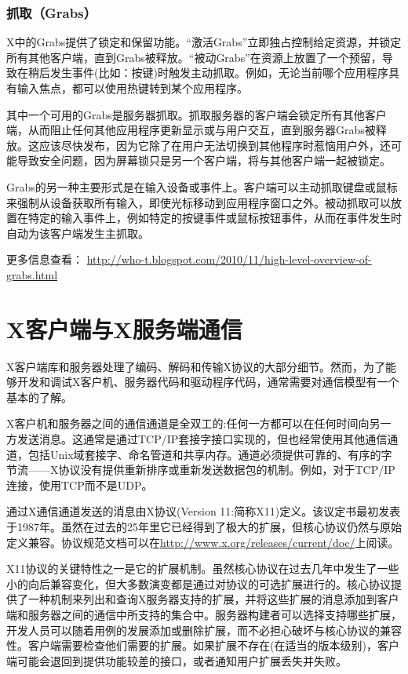 \subsubsection{抓取（Grabs）}

X中的Grabs提供了锁定和保留功能。“激活Grabs”立即独占控制给定资源，并锁定所有其他客户端，直到Grabs被释放。“被动Grabs”在资源上放置了一个预留，导致在稍后发生事件(比如：按键)时触发主动抓取。例如，无论当前哪个应用程序具有输入焦点，都可以使用热键转到某个应用程序。

其中一个可用的Grabs是服务器抓取。抓取服务器的客户端会锁定所有其他客户端，从而阻止任何其他应用程序更新显示或与用户交互，直到服务器Grabs被释放。这应该尽快发布，因为它除了在用户无法切换到其他程序时惹恼用户外，还可能导致安全问题，因为屏幕锁只是另一个客户端，将与其他客户端一起被锁定。

Grabs的另一种主要形式是在输入设备或事件上。客户端可以主动抓取键盘或鼠标来强制从设备获取所有输入，即使光标移动到应用程序窗口之外。被动抓取可以放置在特定的输入事件上，例如特定的按键事件或鼠标按钮事件，从而在事件发生时自动为该客户端发生主抓取。

更多信息查看：
\href{http://who-t.blogspot.com/2010/11/high-level-overview-of-grabs.html}{http://who-t.blogspot.com/2010/11/high-level-overview-of-grabs.html}

\section{X客户端与X服务端通信}

X客户端库和服务器处理了编码、解码和传输X协议的大部分细节。然而，为了能够开发和调试X客户机、服务器代码和驱动程序代码，通常需要对通信模型有一个基本的了解。

X客户机和服务器之间的通信通道是全双工的:任何一方都可以在任何时间向另一方发送消息。这通常是通过TCP/IP套接字接口实现的，但也经常使用其他通信通道，包括Unix域套接字、命名管道和共享内存。通道必须提供可靠的、有序的字节流——X协议没有提供重新排序或重新发送数据包的机制。例如，对于TCP/IP连接，使用TCP而不是UDP。

通过X通信通道发送的消息由X协议(Version 11:简称X11)定义。该议定书最初发表于1987年。虽然在过去的25年里它已经得到了极大的扩展，但核心协议仍然与原始定义兼容。协议规范文档可以在\href{http://www.x.org/releases/current/doc/}{http://www.x.org/releases/current/doc/}上阅读。

X11协议的关键特性之一是它的扩展机制。虽然核心协议在过去几年中发生了一些小的向后兼容变化，但大多数演变都是通过对协议的可选扩展进行的。核心协议提供了一种机制来列出和查询X服务器支持的扩展，并将这些扩展的消息添加到客户端和服务器之间的通信中所支持的集合中。服务器构建者可以选择支持哪些扩展，开发人员可以随着用例的发展添加或删除扩展，而不必担心破坏与核心协议的兼容性。客户端需要检查他们需要的扩展。如果扩展不存在(在适当的版本级别)，客户端可能会退回到提供功能较差的接口，或者通知用户扩展丢失并失败。

